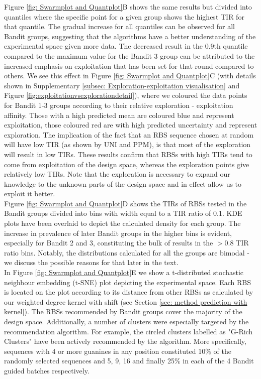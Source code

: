 \documentclass{scrartcl}[2013/05/29]%
\begin{document}
Figure \ref{fig: Swarmplot and Quantplot}B shows the same results but divided into quantiles where the specific point for a given group shows the highest TIR for that quantile.
The gradual increase for all quantiles can be observed for all Bandit groups, suggesting that the algorithms have a better understanding of the experimental space given more data.
The decreased result in the 0.9th quantile compared to the maximum value for the Bandit 3 group can be attributed to the increased emphasis on exploitation that has been set for that round compared to others.
We see this effect in Figure \ref{fig: Swarmplot and Quantplot}C (with details shown in Supplementary \ref{subsec: Exploration-exploitation visualisation} and Figure  \ref{fig:exploitationvsexplorationdetail}), where we coloured the data points for Bandit 1-3 groups according to their relative exploration - exploitation affinity.
Those with a high predicted mean are coloured blue and represent exploitation, those coloured red are with high predicted uncertainty and represent exploration.
The implication of the fact that an RBS sequence chosen at random will have low TIR
(as shown by UNI and PPM), is that most of the exploration will result in low TIRs.
These results confirm that RBSs with high TIRs tend to come from exploitation of the design space,
whereas the exploration points give relatively low TIRs.
Note that the exploration is necessary to expand our knowledge to the unknown parts of the design space and in effect allow us to exploit it better.\\

Figure \ref{fig: Swarmplot and Quantplot}D shows the TIRs of RBSs tested in the Bandit groups divided into bins with width equal to a TIR ratio of 0.1.
KDE plots have been overlaid to depict the calculated density for each group.
The increase in prevalence of later Bandit groups in the higher bins is evident, especially for Bandit 2 and 3, constituting the bulk of results in the $>0.8$ TIR ratio bins.
Notably, the distributions calculated for all the groups are bimodal - we discuss the possible reasons for that later in the text.\\


In Figure \ref{fig: Swarmplot and Quantplot}E we show a t-distributed stochastic neighbour embedding (t-SNE) \mbox{\cite{tsne2008}} plot depicting the experimental space.
Each RBS is located on the plot according to its distance from other RBSs as calculated by our weighted degree kernel with shift (see Section \mbox{\ref{sec: method prediction with kernel}}).
The RBSs recommended by Bandit groups cover the majority of the design space.
Additionally, a number of clusters were especially targeted by the recommendation algorithm.
For example, the circled clusters labelled as "G-Rich Clusters" have been actively recommended by the algorithm.
More specifically, sequences with 4 or more guanines in any position constituted 10\% of the randomly selected sequences and 5, 9, 16 and finally 25\% in each of the 4 Bandit guided batches respectively.
\end{document}
